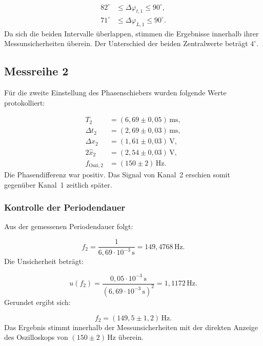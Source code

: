 \documentclass{report}
\begin{document}
\begin{align}
82^\circ&\leq\Delta\varphi_{t,1}\leq90^\circ,\\
71^\circ&\leq\Delta\varphi_{L,1}\leq90^\circ.
\end{align}
\noindent
Da sich die beiden Intervalle überlappen, stimmen die Ergebnisse innerhalb ihrer Messunsicherheiten überein. Der Unterschied der beiden Zentralwerte beträgt $4^\circ$.

\subsection{Messreihe 2}
\noindent
Für die zweite Einstellung des Phasenschiebers wurden folgende Werte protokolliert:

\begin{align}
T_2&=(6{,}69\pm0{,}05)\,\mathrm{ms},\\
\Delta t_2&=(2{,}69\pm0{,}03)\,\mathrm{ms},\\
\Delta x_2&=(1{,}61\pm0{,}03)\,\mathrm{V},\\
2\hat{x}_2&=(2{,}54\pm0{,}03)\,\mathrm{V},\\
f_{\mathrm{Oszi},2}&=(150\pm2)\,\mathrm{Hz}.
\end{align}
\noindent
Die Phasendifferenz war positiv. Das Signal von Kanal~2 erschien somit gegenüber Kanal~1 zeitlich später.

\subsubsection{Kontrolle der Periodendauer}
\noindent
Aus der gemessenen Periodendauer folgt:

\begin{equation}
f_2
=
\frac{1}{6{,}69\cdot10^{-3}\,\mathrm{s}}
=
149{,}4768\,\mathrm{Hz}.
\end{equation}
\noindent
Die Unsicherheit beträgt:

\begin{equation}
u(f_2)
=
\frac{0{,}05\cdot10^{-3}\,\mathrm{s}}
{\left(6{,}69\cdot10^{-3}\,\mathrm{s}\right)^2}
=
1{,}1172\,\mathrm{Hz}.
\end{equation}
\noindent
Gerundet ergibt sich:

\begin{equation}
\boxed{f_2=(149{,}5\pm1{,}2)\,\mathrm{Hz}}.
\end{equation}
\noindent
Das Ergebnis stimmt innerhalb der Messunsicherheiten mit der direkten Anzeige des Oszilloskops von $(150\pm2)\,\mathrm{Hz}$ überein.
\end{document}
